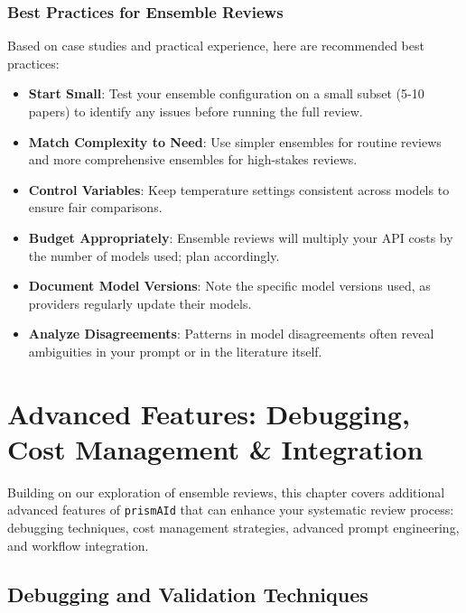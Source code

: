 \subsection{Best Practices for Ensemble Reviews}

Based on case studies and practical experience, here are recommended best practices:

\begin{itemize}
    \item \textbf{Start Small}: Test your ensemble configuration on a small subset (5-10 papers) to identify any issues before running the full review.
    \item \textbf{Match Complexity to Need}: Use simpler ensembles for routine reviews and more comprehensive ensembles for high-stakes reviews.
    \item \textbf{Control Variables}: Keep temperature settings consistent across models to ensure fair comparisons.
    \item \textbf{Budget Appropriately}: Ensemble reviews will multiply your API costs by the number of models used; plan accordingly.
    \item \textbf{Document Model Versions}: Note the specific model versions used, as providers regularly update their models.
    \item \textbf{Analyze Disagreements}: Patterns in model disagreements often reveal ambiguities in your prompt or in the literature itself.
\end{itemize}

\chapter[Debugging, Costs \& Integration]{Advanced Features: Debugging, Cost Management \& Integration} \label{chap:advanced_features}

Building on our exploration of ensemble reviews, this chapter covers additional advanced features of \texttt{prismAId} that can enhance your systematic review process: debugging techniques, cost management strategies, advanced prompt engineering, and workflow integration.

\section{Debugging and Validation Techniques}

